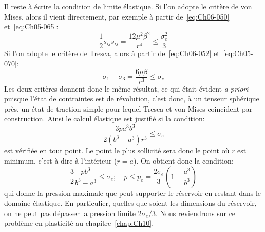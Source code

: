 Il reste à écrire la condition de limite élastique.
Si l'on adopte le critère de von Mises, alors il vient directement, par exemple à partir de~\eqref{eq:Ch06-050} et~\eqref{eq:Ch05-065}:
\begin{equation}
    \frac{1}{2} s_{ij} s_{ij} = \frac{12 \mu^2 \beta^2}{r^4} \leq \frac{\sigma_e^2}{3}
    \label{eq:Ch06-055}
\end{equation}
Si l'on adopte le critère de Tresca, alors à partir de~\eqref{eq:Ch06-052} et~\eqref{eq:Ch05-070}:
\begin{equation}
    \sigma_1 - \sigma_3 = \frac{6\mu\beta}{r^3} \leq \sigma_e
    \label{eq:Ch06-056}
\end{equation}
Les deux critères donnent donc le même résultat, ce qui était évident \textit{a priori} puisque l'état de contraintes est de révolution, c'est donc, à un tenseur sphérique près, un état de traction simple pour lequel Tresca et von Mises coincident par construction.
Ainsi le calcul élastique est justifié si la condition:
\begin{equation}
    \frac{3pa^3b^3}{2\left( b^3 -a^3 \right)r^3} \leq \sigma_e
    \label{eq:Ch06-057}
\end{equation}
est vérifiée en tout point.
Le point le plus sollicité sera donc le point où $r$ est minimum, c'est-à-dire à l'intérieur ($r=a$).
On obtient donc la condition:
\begin{equation}
    \frac{3}{2}\frac{pb^3}{b^3-a^3} \leq \sigma_e ; \quad p \leq p_e = \frac{2\sigma_e}{3} \left( 1 - \frac{a^3}{b^3} \right)
    \label{eq:Ch06-058}
\end{equation}
qui donne la pression maximale que peut supporter le réservoir en restant dans le domaine élastique.
En particulier, quelles que soient les dimensions du réservoir, on ne peut pas dépasser la pression limite $2\sigma_e/3$.
Nous reviendrons sur ce problème en plasticité au chapitre~\ref{chap:Ch10}.

